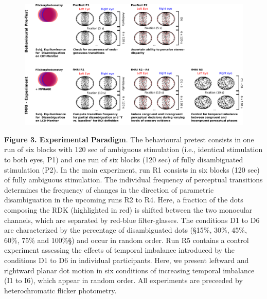 \documentclass[12pt]{article}
\begin{document}
\clearpage
\begin{figure}[h]
\begin{center}
\includegraphics[width=16cm]{Figure_3.png}
\end{center}
\end{figure}

\textbf{Figure 3. Experimental Paradigm}.  The behavioural pretest consists in one run of six blocks with 120 sec of ambiguous stimulation (i.e., identical stimulation to both eyes, P1) and one run of six blocks (120 sec) of fully disambiguated stimulation (P2). In the main experiment, run R1 consists in six blocks (120 sec) of fully ambiguous stimulation. The individual frequency of perceptual transitions determines the frequency of changes in the direction of parametric disambiguation in the upcoming runs R2 to R4. Here, a fraction of the dots composing the RDK (highlighted in red) is shifted between the two monocular channels, which are separated by red-blue filter-glasses. The conditions D1 to D6 are characterized by the percentage of disambiguated dots (§15\%, 30\%, 45\%, 60\%, 75\% and 100\%§) and occur in random order. Run R5 contains a control experiment assessing the effects of temporal imbalance introduced by the conditions D1 to D6 in individual participants. Here, we present leftward and rightward planar dot motion in six conditions of increasing temporal imbalance (I1 to I6), which appear in random order. All experiments are preceeded by heterochromatic flicker photometry. 
\end{document}
